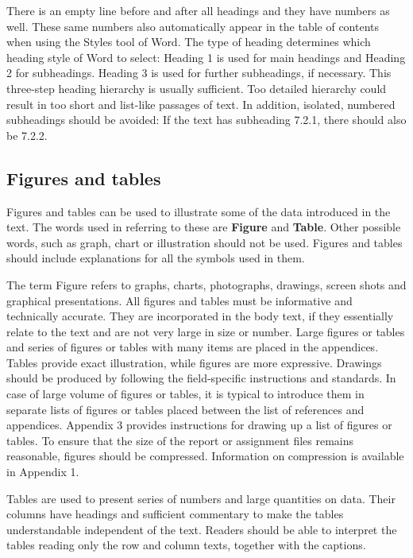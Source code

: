 \documentclass[12pt]{article}
\begin{document}
There is an empty line before and after all headings and they have numbers as well. These same numbers also automatically appear in the table of contents when using the Styles tool of Word. The type of heading determines which heading style of Word to select: Heading 1 is used for main headings and Heading 2 for subheadings. Heading 3 is used for further subheadings, if necessary. This three-step heading hierarchy is usually sufficient. Too detailed hierarchy could result in too short and list-like passages of text. In addition, isolated, numbered subheadings should be avoided: If the text has subheading 7.2.1, there should also be 7.2.2.

\subsection{Figures and tables}
Figures and tables can be used to illustrate some of the data introduced in the text. The words used in referring to these are \textbf{Figure} and \textbf{Table}. Other possible words, such as graph, chart or illustration should not be used. Figures and tables should include explanations for all the symbols used in them.

The term Figure refers to graphs, charts, photographs, drawings, screen shots and graphical presentations. All figures and tables must be informative and technically accurate. They are incorporated in the body text, if they essentially relate to the text and are not very large in size or number. Large figures or tables and series of figures or tables with many items are placed in the appendices. Tables provide exact illustration, while figures are more expressive. Drawings should be produced by following the field-specific instructions and standards. In case of large volume of figures or tables, it is typical to introduce them in separate lists of figures or tables placed between the list of references and appendices. Appendix 3 provides instructions for drawing up a list of figures or tables. To ensure that the size of the report or assignment files remains reasonable, figures should be compressed. Information on compression is available in Appendix 1. 

Tables are used to present series of numbers and large quantities on data. Their columns have headings and sufficient commentary to make the tables understandable independent of the text. Readers should be able to interpret the tables reading only the row and column texts, together with the captions.
\end{document}
